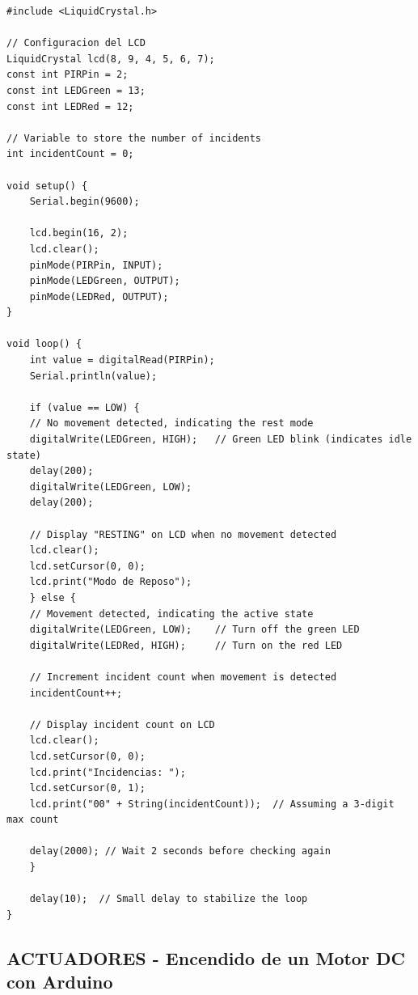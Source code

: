 \documentclass{article}
\begin{document}
\begin{lstlisting}[style=cppstyle, caption={Código en C++ para el sistema de control de aforo.}, label={code:sensor_ambiental}]
#include <LiquidCrystal.h>

// Configuracion del LCD
LiquidCrystal lcd(8, 9, 4, 5, 6, 7);
const int PIRPin = 2;
const int LEDGreen = 13;
const int LEDRed = 12;

// Variable to store the number of incidents
int incidentCount = 0;

void setup() {
    Serial.begin(9600);
    
    lcd.begin(16, 2);
    lcd.clear();
    pinMode(PIRPin, INPUT);
    pinMode(LEDGreen, OUTPUT);
    pinMode(LEDRed, OUTPUT);
}

void loop() {
    int value = digitalRead(PIRPin);
    Serial.println(value);

    if (value == LOW) {
    // No movement detected, indicating the rest mode
    digitalWrite(LEDGreen, HIGH);   // Green LED blink (indicates idle state)
    delay(200);
    digitalWrite(LEDGreen, LOW);
    delay(200);
    
    // Display "RESTING" on LCD when no movement detected
    lcd.clear();
    lcd.setCursor(0, 0);
    lcd.print("Modo de Reposo");
    } else {
    // Movement detected, indicating the active state
    digitalWrite(LEDGreen, LOW);    // Turn off the green LED
    digitalWrite(LEDRed, HIGH);     // Turn on the red LED

    // Increment incident count when movement is detected
    incidentCount++;

    // Display incident count on LCD
    lcd.clear();
    lcd.setCursor(0, 0);
    lcd.print("Incidencias: ");
    lcd.setCursor(0, 1);
    lcd.print("00" + String(incidentCount));  // Assuming a 3-digit max count
    
    delay(2000); // Wait 2 seconds before checking again
    }
    
    delay(10);  // Small delay to stabilize the loop
}    
\end{lstlisting}
    


\subsection{ACTUADORES - Encendido de un Motor DC con Arduino}
\end{document}
